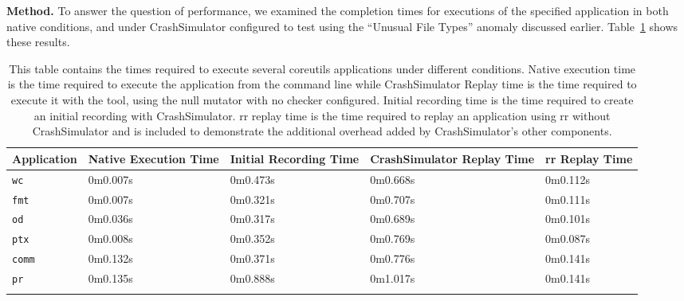 {\bf Method.}
To answer the question of performance, we examined the completion
times for executions of the specified application in both
native conditions, and under CrashSimulator configured to test using the ``Unusual File
Types'' anomaly discussed earlier.
Table~\ref{table:performance} shows these results.

%

 \begin{table}[t]
    \scriptsize{}
    \begin{tabular}{l p{1cm} p{1cm} p{1.2cm} p{1cm}}
    \toprule{}
        Application     & Native Execution Time & Initial Recording Time & CrashSimulator Replay Time & rr Replay Time  \\
\hline
        {\tt wc}        & 0m0.007s              & 0m0.473s               & 0m0.668s                   & 0m0.112s        \\
        {\tt fmt}       & 0m0.007s              & 0m0.321s               & 0m0.707s                   & 0m0.111s        \\
        {\tt od}        & 0m0.036s              & 0m0.317s               & 0m0.689s                   & 0m0.101s        \\
        {\tt ptx}       & 0m0.008s              & 0m0.352s               & 0m0.769s                   & 0m0.087s        \\
        {\tt comm}      & 0m0.132s              & 0m0.371s               & 0m0.776s                   & 0m0.141s        \\
        {\tt pr}        & 0m0.135s              & 0m0.888s               & 0m1.017s                   & 0m0.141s        \\
    \bottomrule{}
    \end{tabular}
    \caption{This table contains the times required to execute several coreutils applications under different conditions.
             Native execution time is the time required to execute the application from the command line while
             CrashSimulator Replay time is the time required to execute it with the tool, using the null mutator with no checker configured.
             Initial recording time is the time required to create an initial recording with CrashSimulator.  rr replay time is the
             time required to replay an application using rr without CrashSimulator and is included to demonstrate the additional
             overhead added by CrashSimulator's other components.}
    \label{table:performance}
\end{table}


